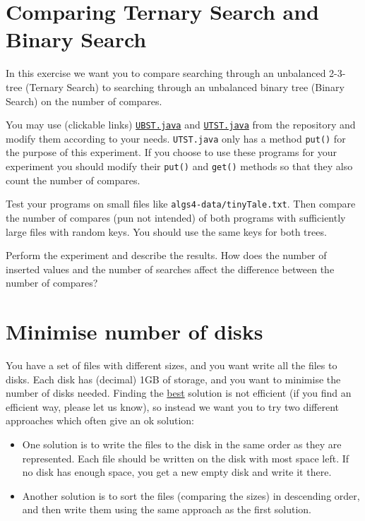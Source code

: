 \documentclass[11pt]{article}
\begin{document}
\section*{Comparing Ternary Search and Binary Search}
In this exercise we want you to compare searching through an unbalanced 2-3-tree (Ternary Search) to searching through an unbalanced binary tree (Binary Search) on the number of compares.

You may use (clickable links)
\href{https://github.com/marcbezem/INF102/blob/master/programs/searching/elementarySymbolTables/UBST.java}{\texttt{UBST.java}}
and
\href{https://github.com/marcbezem/INF102/blob/master/programs/searching/elementarySymbolTables/UTST.java}{\texttt{UTST.java}}
from the repository and modify them according to your needs.
\texttt{UTST.java} only has a method \texttt{put()} for the purpose of this experiment. If you choose to use these programs for your experiment you should modify their \texttt{put()} and \texttt{get()}
methods so that they also count the number of compares.

Test your programs on small files like \texttt{algs4-data/tinyTale.txt}.
Then compare the number of compares (pun not intended) of both programs
with sufficiently large files with random keys. You should use the same keys for both trees.

Perform the experiment and describe the results. How does the number of inserted values and the number of searches affect the difference between the number of compares?


\section*{Minimise number of disks}
You have a set of files with different sizes, and you want write all the files to disks. Each disk has (decimal) 1GB of storage, and you want to minimise the number of disks needed. Finding the \underline{best} solution is not efficient (if you find an efficient way, please let us know), so instead we want you to try two different approaches which often give an ok solution:

\begin{itemize}
  \item One solution is to write the files to the disk in the same order as they are represented. Each file should be written on the disk with most space left. If no disk has enough space, you get a new empty disk and write it there.
  \item Another solution is to sort the files (comparing the sizes) in descending order, and then write them using the same approach as the first solution.
\end{itemize}
\end{document}
